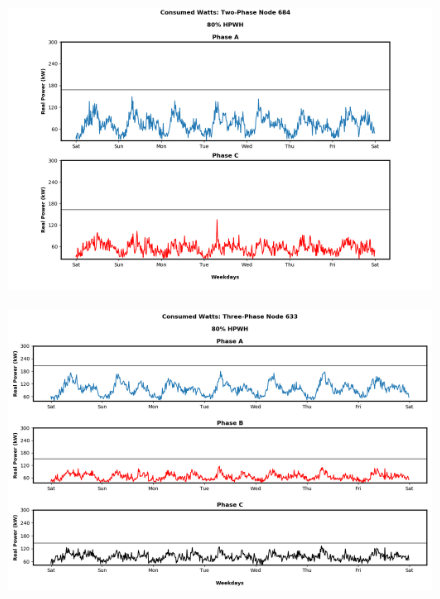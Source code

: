 \begin{figure}[H]
    \centering
    \includegraphics[width=1.1\columnwidth]{Pictures/eighty_two_phase_684_power.png}
    \caption{ }
\end{figure}

\newpage

\begin{figure}[H]
    \centering
    \includegraphics[width=1.1\columnwidth]{Pictures/eighty_three_phase_633_power.png}
    \caption{ }
\end{figure}

\newpage





